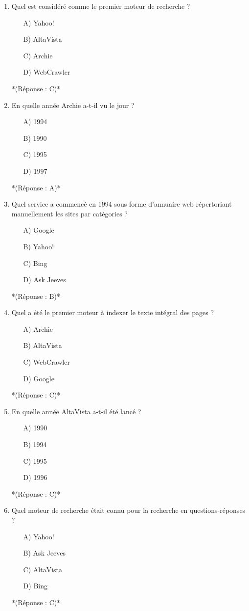 \documentclass[12pt,a4paper,twoside]{report}
\begin{document}
\begin{enumerate}
\item Quel est considéré comme le premier moteur de recherche ?
\begin{itemize}
\item[A)] Yahoo!
\item[B)] AltaVista
\item[C)] Archie
\item[D)] WebCrawler
\end{itemize}
*(Réponse : C)*

\item En quelle année Archie a-t-il vu le jour ?
\begin{itemize}
\item[A)] 1994
\item[B)] 1990
\item[C)] 1995
\item[D)] 1997
\end{itemize}
*(Réponse : A)*

\item Quel service a commencé en 1994 sous forme d'annuaire web répertoriant manuellement les sites par catégories ?
\begin{itemize}
\item[A)] Google
\item[B)] Yahoo!
\item[C)] Bing
\item[D)] Ask Jeeves
\end{itemize}
*(Réponse : B)*

\item Quel a été le premier moteur à indexer le texte intégral des pages ?
\begin{itemize}
\item[A)] Archie
\item[B)] AltaVista
\item[C)] WebCrawler
\item[D)] Google
\end{itemize}
*(Réponse : C)*

\item En quelle année AltaVista a-t-il été lancé ?
\begin{itemize}
\item[A)] 1990
\item[B)] 1994
\item[C)] 1995
\item[D)] 1996
\end{itemize}
*(Réponse : C)*

\item Quel moteur de recherche était connu pour la recherche en questions-réponses ?
\begin{itemize}
\item[A)] Yahoo!
\item[B)] Ask Jeeves
\item[C)] AltaVista
\item[D)] Bing
\end{itemize}
*(Réponse : C)*


\end{enumerate}
\end{document}
